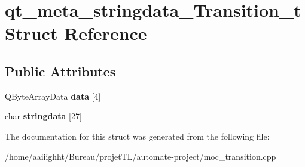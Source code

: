\hypertarget{structqt__meta__stringdata___transition__t}{\section{qt\-\_\-meta\-\_\-stringdata\-\_\-\-Transition\-\_\-t Struct Reference}
\label{structqt__meta__stringdata___transition__t}
}
\subsection*{Public Attributes}
\begin{DoxyCompactItemize}
\item 
\hypertarget{structqt__meta__stringdata___transition__t_a420f3dc424f227b1518aaa09fbf40b72}{Q\-Byte\-Array\-Data {\bfseries data} \mbox{[}4\mbox{]}}\label{structqt__meta__stringdata___transition__t_a420f3dc424f227b1518aaa09fbf40b72}

\item 
\hypertarget{structqt__meta__stringdata___transition__t_a99978081bcceecad4629a80f196be3a6}{char {\bfseries stringdata} \mbox{[}27\mbox{]}}\label{structqt__meta__stringdata___transition__t_a99978081bcceecad4629a80f196be3a6}

\end{DoxyCompactItemize}


The documentation for this struct was generated from the following file\-:\begin{DoxyCompactItemize}
\item 
/home/aaiiighht/\-Bureau/projet\-T\-L/automate-\/project/moc\-\_\-transition.\-cpp\end{DoxyCompactItemize}
